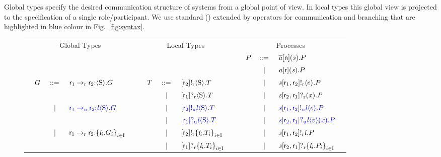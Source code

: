 Global types specify the desired communication structure of systems from a global point of view.
In local types this global view is projected to the specification of a single role/participant.
We use standard \MPST (\cite{HondaYoshidaCarbone08,hondaYoshidaCarbone16}) extended by operators for \unrel communication and \weakR branching that are highlighted in blue colour in Fig.~\ref{fig:syntax}.

\begin{figure}[t]
	\centering
	\renewcommand{\tabcolsep}{1pt}
	\begin{tabular}{|llclr|llclr|llclr|}
		\hline
		\multicolumn{5}{|c|}{Global Types} & \multicolumn{5}{c|}{Local Types} & \multicolumn{5}{c|}{Processes}\\
		&&&&& &&&&& & $ P $ & $ \deffTerms $ & $ \PReq{\Chan[a]}{\Role[n]}{\Chan}{P} $ &\\
		&&&&& &&&&& & & $ \sepTerms $ & $ \PAcc{\Chan[a]}{\Role}{\Chan}{P} $ &\\
		& \multirow{2}{*}{$ \GT $} & \multirow{2}{*}{$ \deffTerms $} & \multirow{2}{*}{$ \GComR{\Role_1}{\Role_2}{\Sort}{\GT} $} & & & $ \LT $ & $ \deffTerms $ & $ \LSendR{\Role_2}{\Sort}{\LT} $ & & & & $ \sepTerms $ & $ \PSendR{\Chan}{\Role_1}{\Role_2}{\Expr}{P} $ &\\
		&&&&& & & $ \sepTerms $ & $ \LGetR{\Role_1}{\Sort}{\LT} $ & & & & $ \sepTerms $ & $ \PGetR{\Chan}{\Role_2}{\Role_1}{\Args}{\PT} $ &\\
		& & \multirow{2}{*}{$ \sepTerms $} & \multirow{2}{*}{$ \textcolor{blue}{\GComU{\Role_1}{\Role_2}{\Label}{\Sort}{\GT}} $} & & & & $ \sepTerms $ & $ \textcolor{blue}{\LSendU{\Role_2}{\Label}{\Sort}{\LT}} $ & & & & $ \sepTerms $ & $ \textcolor{blue}{\PSendU{\Chan}{\Role_1}{\Role_2}{\Label}{\Expr}{P}} $ &\\
		&&&&& & & $ \sepTerms $ & $ \textcolor{blue}{\LGetU{\Role_1}{\Label}{\Sort}{\LT}} $ & & & & $ \sepTerms $ & $ \textcolor{blue}{\PGetU{\Chan}{\Role_2}{\Role_1}{\Label}{\Expr[v]}{\Args}{P}} $ &\\
		& & \multirow{2}{*}{$ \sepTerms $} & \multirow{2}{*}{$ \GBranR{\Role_1}{\Role_2}{\Set{ \Label_i.\GT_i}_{i \in \indexSet}} $} & & & & $ \sepTerms $ & $ \LSelR{\Role_2}{\Set{ \Label_i.\LT_i }_{i \in \indexSet}} $ & & & & $ \sepTerms $ & $ \PSelR{\Chan}{\Role_1}{\Role_2}{\Label}{P} $ &\\
		&&&&& & & $ \sepTerms $ & $ \LBranR{\Role_1}{\Set{ \Label_i.\LT_i }_{i \in \indexSet}} $ & & & & $ \sepTerms $ & $ \PBranR{\Chan}{\Role_2}{\Role_1}{\Set{ \Label_i.P_i }_{i \in \indexSet}} $ &\\

\end{tabular}
\end{figure}
